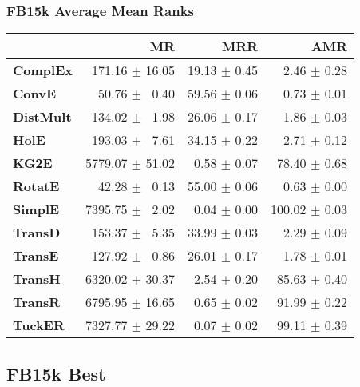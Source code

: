\documentclass{article}
\begin{document}
\subsubsection{FB15k Average Mean Ranks}
    \begin{center}
    \begin{tabular}{lrrr}
\toprule
{} &               MR &           MRR &            AMR \\
\midrule
\textbf{ComplEx } &  $\phantom{5}$171.16 $\pm$ 16.05 &  19.13 $\pm$ 0.45 &  $\phantom{5}$$\phantom{5}$2.46 $\pm$ 0.28 \\
\textbf{ConvE   } &  $\phantom{5}$$\phantom{5}$50.76 $\pm$ $\phantom{5}$0.40 &  59.56 $\pm$ 0.06 &  $\phantom{5}$$\phantom{5}$0.73 $\pm$ 0.01 \\
\textbf{DistMult} &  $\phantom{5}$134.02 $\pm$ $\phantom{5}$1.98 &  26.06 $\pm$ 0.17 &  $\phantom{5}$$\phantom{5}$1.86 $\pm$ 0.03 \\
\textbf{HolE    } &  $\phantom{5}$193.03 $\pm$ $\phantom{5}$7.61 &  34.15 $\pm$ 0.22 &  $\phantom{5}$$\phantom{5}$2.71 $\pm$ 0.12 \\
\textbf{KG2E    } &  5779.07 $\pm$ 51.02 &  $\phantom{5}$0.58 $\pm$ 0.07 &  $\phantom{5}$78.40 $\pm$ 0.68 \\
\textbf{RotatE  } &  $\phantom{5}$$\phantom{5}$42.28 $\pm$ $\phantom{5}$0.13 &  55.00 $\pm$ 0.06 &  $\phantom{5}$$\phantom{5}$0.63 $\pm$ 0.00 \\
\textbf{SimplE  } &  7395.75 $\pm$ $\phantom{5}$2.02 &  $\phantom{5}$0.04 $\pm$ 0.00 &  100.02 $\pm$ 0.03 \\
\textbf{TransD  } &  $\phantom{5}$153.37 $\pm$ $\phantom{5}$5.35 &  33.99 $\pm$ 0.03 &  $\phantom{5}$$\phantom{5}$2.29 $\pm$ 0.09 \\
\textbf{TransE  } &  $\phantom{5}$127.92 $\pm$ $\phantom{5}$0.86 &  26.01 $\pm$ 0.17 &  $\phantom{5}$$\phantom{5}$1.78 $\pm$ 0.01 \\
\textbf{TransH  } &  6320.02 $\pm$ 30.37 &  $\phantom{5}$2.54 $\pm$ 0.20 &  $\phantom{5}$85.63 $\pm$ 0.40 \\
\textbf{TransR  } &  6795.95 $\pm$ 16.65 &  $\phantom{5}$0.65 $\pm$ 0.02 &  $\phantom{5}$91.99 $\pm$ 0.22 \\
\textbf{TuckER  } &  7327.77 $\pm$ 29.22 &  $\phantom{5}$0.07 $\pm$ 0.02 &  $\phantom{5}$99.11 $\pm$ 0.39 \\
\bottomrule
\end{tabular}

    \end{center}
\subsection{FB15k Best}
\end{document}
